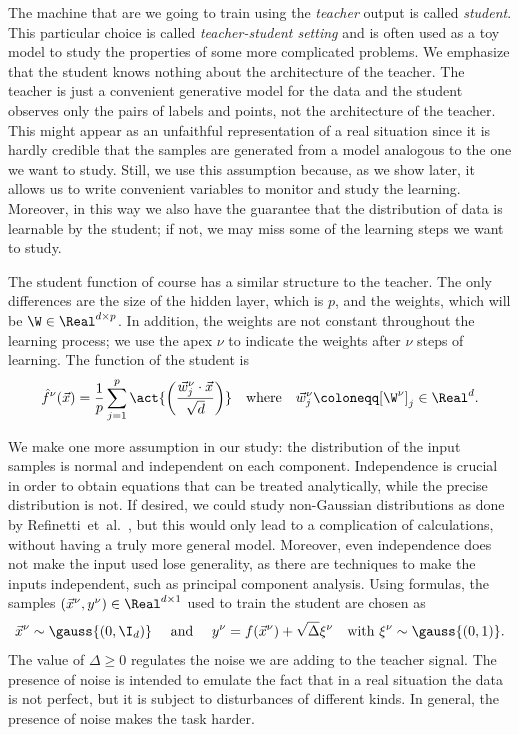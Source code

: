 The machine that are we going to train using the \emph{teacher} output is called \emph{student}.
This particular choice is called \emph{teacher-student setting} and is often used
as a toy model to study the properties of some more complicated problems.
We emphasize that the student knows nothing about the architecture of the teacher.
The teacher is just a convenient generative model for the data and the student observes only the pairs of labels and points,
not the architecture of the teacher.
This might appear as an unfaithful representation of a real situation since it is hardly credible 
that the samples are generated from a model analogous to the one we want to study.
Still, we use this assumption because, as we show later, it allows us to write convenient
variables to monitor and study the learning.
Moreover, in this way we also have the guarantee that the distribution of data is learnable by the student;
if not, we may miss some of the learning steps we want to study.

The student function of course has a similar structure to the teacher.
The only differences are the size of the hidden layer, which is \(p\),
and the weights, which will be  \(\W \in \Real^{d\times p}\). In addition, the weights are not constant
throughout the learning process; we use the apex \(\nu\) to indicate the weights after \(\nu\) steps of learning.
The function of the student is
\[
  \hat{f}^\nu{(\vec{x})} = \frac{1}{p}\sum_{j=1}^{p} \act{\left(\frac{\vec{w}^\nu_j \cdot \vec{x}}{\sqrt{d}}\right)}
  \quad\text{where}\quad \vec{w}^\nu_j \coloneqq [\W^\nu]_j \in \Real^d. 
\]

We make one more assumption in our study: the distribution of the input samples is
normal and independent on each component.
Independence is crucial in order to obtain equations that can be treated analytically,
while the precise distribution is not. 
If desired, we could study non-Gaussian distributions as done by Refinetti~et~al.~\cite{refinetti2022dynamics},
but this would only lead to a complication of calculations, without having a truly more general model.
Moreover, even independence does not make the input used lose generality,
as there are techniques to make the inputs independent, such as principal component analysis.
Using formulas, the samples \(\left(\vec{x}^\nu, y^\nu\right) \in \Real^{d\times1}\) 
used to train the student are chosen as
\[
  \vec{x}^\nu \sim \gauss{(0,\I_d)} \quad\text{ and }\quad 
  y^\nu = f{(\vec{x}^\nu) + \sqrt{\Delta}\xi^\nu}\quad\text{with } \xi^\nu \sim \gauss{(0,1)}.
\]
The value of \(\Delta\ge0\) regulates the noise we are adding to the teacher signal.
The presence of noise is intended to emulate the fact that in a real situation the 
data is not perfect, but it is subject to disturbances of different kinds.
In general, the presence of noise makes the task harder.

